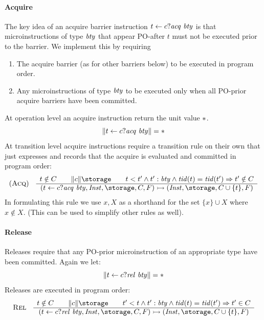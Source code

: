 \paragraph{Acquire}
%
The key idea of an acquire barrier instruction $t \leftarrow c ? \mathit{acq}\ \mathit{bty}$ is that microinstructions of type $\mathit{bty}$ that appear PO-after $t$ must not be executed prior to the barrier. We implement this by requiring
\begin{enumerate}
\item The acquire barrier (as for other barriers below) to be executed in program order.
\item Any microinstructions of type $\mathit{bty}$ to be executed only when all PO-prior acquire barriers have been committed.
\end{enumerate}
%
At operation level an acquire instruction return the unit value $*$.
\[
\mbox{$\parallel$} t \leftarrow c ? \mathit{acq}\ \mathit{bty} \mbox{$\parallel$} = *
\]
At transition level acquire instructions require a transition rule on their own that just expresses and records that the acquire is evaluated and committed in program order:
%
\[
\begin{array}{cc}
(\mbox{\sc{Acq}})
&
\begin{array}{c}
  t\notin\Commits \qquad
  \den{c}{\storage} \qquad
  t<t' \wedge t':\btype\wedge\tid(t) = \tid(t')\Rightarrow t'\notin\Commits \\ \hline
(\ass{c}{t}{\acq{\btype}},\Inst, \storage, \Commits, \Decodes) \rightarrowtail (\Inst,\storage, \Commits\cup\{t\}, \Decodes)
\end{array}
\end{array}
\]
%
In formulating this rule we use $x,X$ as a shorthand for the set $\{x\}\cup X$ where $x\notin X$. (This can be used to simplify other rules as well).

\paragraph{Release}
Releases require that any PO-prior microinstruction of an appropriate type have been committed. 
%
Again we let:
%
\[
\mbox{$\parallel$} t \leftarrow c ? \mathit{rel}\ \mathit{bty} \mbox{$\parallel$}=*
\]
Releases are executed in program order:
%
\[
\begin{array}{cc}
\mbox{\sc{Rel}} &
\begin{array}{c}
t\notin\Commits \qquad
\den{c}{\storage} \qquad
t'<t \wedge t':\btype \wedge\tid(t) = \tid(t') \Rightarrow t'\in\Commits \\ \hline
(\ass{c}{t}{\rel{\btype}},\Inst, \storage, \Commits, \Decodes)\rightarrowtail
(\Inst,\storage,\Commits\cup\{t\},\Decodes)
\end{array}
\end{array}
\]
%

